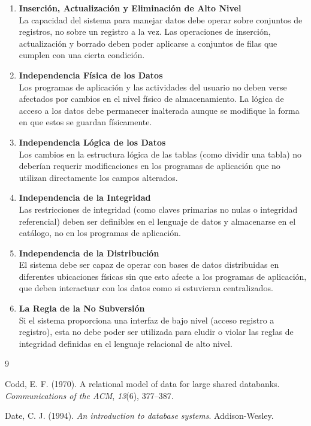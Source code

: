\documentclass[12pt, a4paper]{article}
\begin{document}
\begin{enumerate}
    \item \textbf{Inserción, Actualización y Eliminación de Alto Nivel} \\
    La capacidad del sistema para manejar datos debe operar sobre conjuntos de registros, no sobre un registro a la vez. Las operaciones de inserción, actualización y borrado deben poder aplicarse a conjuntos de filas que cumplen con una cierta condición.

    \item \textbf{Independencia Física de los Datos} \\
    Los programas de aplicación y las actividades del usuario no deben verse afectados por cambios en el nivel físico de almacenamiento. La lógica de acceso a los datos debe permanecer inalterada aunque se modifique la forma en que estos se guardan físicamente.

    \item \textbf{Independencia Lógica de los Datos} \\
    Los cambios en la estructura lógica de las tablas (como dividir una tabla) no deberían requerir modificaciones en los programas de aplicación que no utilizan directamente los campos alterados.

    \item \textbf{Independencia de la Integridad} \\
    Las restricciones de integridad (como claves primarias no nulas o integridad referencial) deben ser definibles en el lenguaje de datos y almacenarse en el catálogo, no en los programas de aplicación.

    \item \textbf{Independencia de la Distribución} \\
    El sistema debe ser capaz de operar con bases de datos distribuidas en diferentes ubicaciones físicas sin que esto afecte a los programas de aplicación, que deben interactuar con los datos como si estuvieran centralizados.

    \item \textbf{La Regla de la No Subversión} \\
    Si el sistema proporciona una interfaz de bajo nivel (acceso registro a registro), esta no debe poder ser utilizada para eludir o violar las reglas de integridad definidas en el lenguaje relacional de alto nivel.
\end{enumerate}

\begin{thebibliography}{9}

Codd, E. F. (1970). A relational model of data for large shared databanks. \textit{Communications of the ACM}, \textit{13}(6), 377–387.

Date, C. J. (1994). \textit{An introduction to database systems}. Addison-Wesley.

\end{thebibliography}
\end{document}
